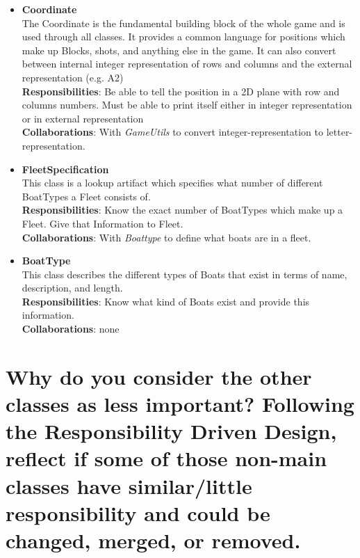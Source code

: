 \documentclass{article}
\begin{document}
\begin{itemize}
    \item \textbf{Coordinate}\\
    The Coordinate is the fundamental building block of the whole game and is used through all classes. It provides a common language for positions which make up Blocks, shots, and anything else in the game. It can also convert between internal integer representation of rows and columns and the external representation (e.g. A2)\\
    \textbf{Responsibilities}: Be able to tell the position in a 2D plane with row and columns numbers. Must be able to print itself either in integer representation or in external representation\\
    \textbf{Collaborations}: With \textit{GameUtils} to convert integer-representation to letter-representation.
    
    \item \textbf{FleetSpecification}\\
    This class is a lookup artifact which specifies what number of different BoatTypes a Fleet consists of.\\
    \textbf{Responsibilities}: Know the exact number of BoatTypes which make up a Fleet. Give that Information to Fleet.\\
    \textbf{Collaborations}: With \textit{Boattype} to define what boats are in a fleet.
    
    \item \textbf{BoatType}\\
    This class describes the different types of Boats that exist in terms of name, description, and length.\\
    \textbf{Responsibilities}: Know what kind of Boats exist and provide this information.\\
    \textbf{Collaborations}: none
\end{itemize}




\newpage
\section{Why do you consider the other classes as less important? Following the Responsibility Driven Design, reflect if some of those non-main classes have similar/little responsibility and could be changed, merged, or removed.}
\end{document}
